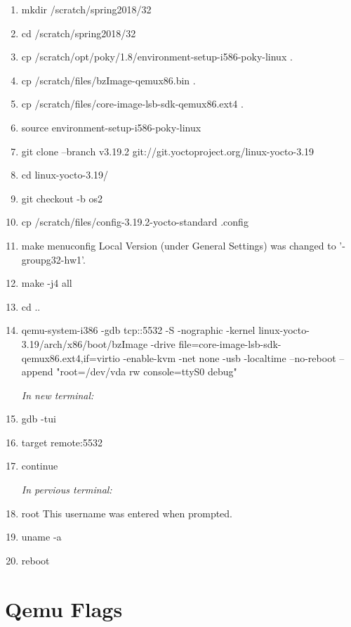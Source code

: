 \documentclass[onecolumn, draftclsnofoot,10pt, compsoc]{IEEEtran}
\begin{document}
\begin{enumerate}
    \item mkdir /scratch/spring2018/32
    \item cd /scratch/spring2018/32
    \item cp /scratch/opt/poky/1.8/environment-setup-i586-poky-linux .
    \item cp /scratch/files/bzImage-qemux86.bin .
    \item cp /scratch/files/core-image-lsb-sdk-qemux86.ext4 .
    \item source environment-setup-i586-poky-linux
    \item git clone --branch v3.19.2 git://git.yoctoproject.org/linux-yocto-3.19
    \item cd linux-yocto-3.19/
    \item git checkout -b os2
    \item cp /scratch/files/config-3.19.2-yocto-standard .config
    \item make menuconfig \newline \indent Local Version (under General Settings) was changed to '-groupg32-hw1'.
    \item make -j4 all
    \item cd ..
    \item qemu-system-i386 -gdb tcp::5532 -S -nographic -kernel linux-yocto-3.19/arch/x86/boot/bzImage -drive file=core-image-lsb-sdk-qemux86.ext4,if=virtio -enable-kvm -net none -usb -localtime --no-reboot --append "root=/dev/vda rw console=ttyS0 debug"
    
    \vspace{3mm}
    \emph{In new terminal:}
    
    \item gdb -tui
    \item target remote:5532
    \item continue
    
    \vspace{3mm}
    \emph{In pervious terminal:}
    
    \item root \newline This username was entered when prompted.
    \item uname -a
    \item reboot
\end{enumerate}

\section{Qemu Flags}
\end{document}
